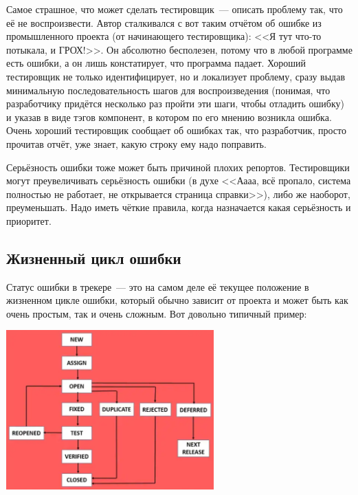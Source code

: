 \documentclass{../../text-style}
\begin{document}
Самое страшное, что может сделать тестировщик~--- описать проблему так, что её не воспроизвести. Автор сталкивался с вот таким отчётом об ошибке из промышленного проекта (от начинающего тестировщика): <<Я тут что-то потыкала, и ГРОХ!>>. Он абсолютно бесполезен, потому что в любой программе есть ошибки, а он лишь констатирует, что программа падает. Хороший тестировщик не только идентифицирует, но и локализует проблему, сразу выдав минимальную последовательность шагов для воспроизведения (понимая, что разработчику придётся несколько раз пройти эти шаги, чтобы отладить ошибку) и указав в виде тэгов компонент, в котором по его мнению возникла ошибка. Очень хороший тестировщик сообщает об ошибках так, что разработчик, просто прочитав отчёт, уже знает, какую строку ему надо поправить.

Серьёзность ошибки тоже может быть причиной плохих репортов. Тестировщики могут преувеличивать серьёзность ошибки (в духе <<Аааа, всё пропало, система полностью не работает, не открывается страница справки>>), либо же наоборот, преуменьшать. Надо иметь чёткие правила, когда назначается какая серьёзность и приоритет.

\subsection{Жизненный цикл ошибки}

Статус ошибки в трекере~--- это на самом деле её текущее положение в жизненном цикле ошибки, который обычно зависит от проекта и может быть как очень простым, так и очень сложным. Вот довольно типичный пример:

\begin{center}
    \includegraphics[width=0.6\textwidth]{bugLifecycle1.png}
\end{center}
\end{document}
